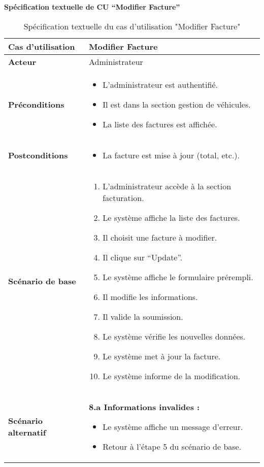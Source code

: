 \documentclass[a4paper,11pt]{report}
\begin{document}
\textbf{Spécification textuelle de CU “Modifier Facture”}

\begin{table}[H]
  \centering
  \renewcommand{\arraystretch}{1.5}
  \caption{Spécification textuelle du cas d'utilisation "Modifier Facture"}
  \begin{tabularx}{\textwidth}{|l|X|}
    \hline
    \textbf{Cas d'utilisation} & Modifier Facture \\ \hline
    \textbf{Acteur}            & Administrateur \\ \hline
    \textbf{Préconditions}     & 
      \begin{itemize}
        \item L’administrateur est authentifié.
        \item Il est dans la section gestion de véhicules.
        \item La liste des factures est affichée.
      \end{itemize} \\ \hline
    \textbf{Postconditions}    & 
      \begin{itemize}
        \item La facture est mise à jour (total, etc.).
      \end{itemize} \\ \hline
    \textbf{Scénario de base}  & 
      \begin{enumerate}
        \item L’administrateur accède à la section facturation.
        \item Le système affiche la liste des factures.
        \item Il choisit une facture à modifier.
        \item Il clique sur “Update”.
        \item Le système affiche le formulaire prérempli.
        \item Il modifie les informations.
        \item Il valide la soumission.
        \item Le système vérifie les nouvelles données.
        \item Le système met à jour la facture.
        \item Le système informe de la modification.
      \end{enumerate} \\ \hline
    \textbf{Scénario alternatif} & 
      \textbf{8.a Informations invalides :}
      \begin{itemize}
        \item Le système affiche un message d’erreur.
        \item Retour à l’étape 5 du scénario de base.
      \end{itemize} \\ \hline
  \end{tabularx}
\end{table}
\end{document}
